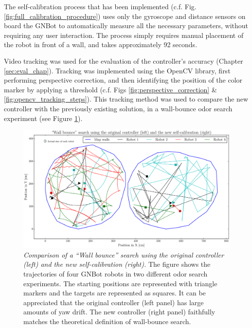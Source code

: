 \documentclass[12pt,twoside]{report}
\begin{document}
The self-calibration process that has been implemented (c.f. Fig. \ref{fig:full_calibration_procedure}) uses only the gyroscope and distance sensors on board the GNBot to automatically measure all the necessary parameters, without requiring any user interaction. The process simply requires manual placement of the robot in front of a wall, and takes approximately 92 seconds.

Video tracking was used for the evaluation of the controller's accuracy (Chapter \ref{sec:eval_chap}). Tracking was implemented using the OpenCV library, first performing perspective correction, and then identifying the position of the color marker by applying a threshold (c.f. Figs \ref{fig:perspective_correction} \& \ref{fig:opencv_tracking_steps}). This tracking method was used to compare the new controller with the previously existing solution, in a wall-bounce odor search experiment (see Figure \ref{fig:wallBounce_oldVSnew}).

\begin{figure}[hbtp]
\centerline{\includegraphics[width=1.1\linewidth]{wallBounce_oldVSnew}}
\caption[Comparison of a ``Wall bounce'' search using the original controller and the new self-calibration]{\emph{Comparison of a ``Wall bounce'' search using the original controller (left) and the new self-calibration (right).}
The figure shows the trajectories of four GNBot robots in two different odor search experiments. The starting positions are represented with triangle markers
and the targets are represented as squares.
It can be appreciated that the original controller (left panel) has large amounts of yaw drift. The new controller (right panel) faithfully matches the theoretical definition of wall-bounce search.
}
\label{fig:wallBounce_oldVSnew}
\end{figure}
\end{document}
